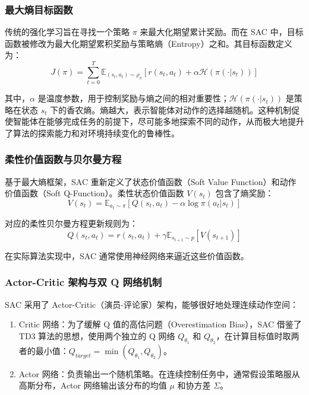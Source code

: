 \subsubsection{最大熵目标函数}
传统的强化学习旨在寻找一个策略 $\pi$ 来最大化期望累计奖励。而在 SAC 中，目标函数被修改为最大化期望累积奖励与策略熵（Entropy）之和。其目标函数定义为：
\begin{equation}
    J(\pi) = \sum_{t=0}^{T} \mathbb{E}_{(s_t, a_t) \sim \rho_\pi} \left[ r(s_t, a_t) + \alpha \mathcal{H}(\pi(\cdot|s_t)) \right]
\end{equation}

其中，$\alpha$ 是温度参数，用于控制奖励与熵之间的相对重要性；$\mathcal{H}(\pi(\cdot|s_t))$ 是策略在状态 $s_t$ 下的香农熵。熵越大，表示智能体对动作的选择越随机。这种机制促使智能体在能够完成任务的前提下，尽可能多地探索不同的动作，从而极大地提升了算法的探索能力和对环境持续变化的鲁棒性。

\subsubsection{柔性价值函数与贝尔曼方程}
基于最大熵框架，SAC 重新定义了状态价值函数（Soft Value Function）和动作价值函数（Soft Q-Function）。柔性状态价值函数 $V(s_t)$ 包含了熵奖励：
\begin{equation}
    V(s_t) = \mathbb{E}_{a_t \sim \pi} \left[ Q(s_t, a_t) - \alpha \log \pi(a_t|s_t) \right]
\end{equation}

对应的柔性贝尔曼方程更新规则为：
\begin{equation}
    Q(s_t, a_t) = r(s_t, a_t) + \gamma \mathbb{E}_{s_{t+1} \sim p} \left[ V(s_{t+1}) \right]
\end{equation}

在实际算法实现中，SAC 通常使用神经网络来逼近这些价值函数。

\subsubsection{Actor-Critic 架构与双 Q 网络机制}
SAC 采用了 Actor-Critic（演员-评论家）架构，能够很好地处理连续动作空间：
\begin{enumerate}
    \item Critic 网络：为了缓解 Q 值的高估问题（Overestimation Bias），SAC 借鉴了 TD3 算法的思想，使用两个独立的 Q 网络 $Q_{\theta_1}$ 和 $Q_{\theta_2}$，在计算目标值时取两者的最小值：$Q_{target} = \min(Q_{\theta_1}, Q_{\theta_2})$。
    \item Actor 网络：负责输出一个随机策略。在连续控制任务中，通常假设策略服从高斯分布，Actor 网络输出该分布的均值 $\mu$ 和协方差 $\Sigma$。
\end{enumerate}

